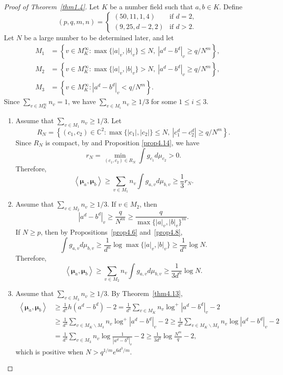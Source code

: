 \documentclass[10pt,a4paper]{amsart}
\numberwithin{equation}{section}
\theoremstyle{plain}
\theoremstyle{definition}
\theoremstyle{remark}
\newcommand{\C}{\mathbb C}
\begin{document}
\begin{proof}[Proof of Theorem~\ref{thm1.4}]
Let $K$ be a number field such that $a,b\in K$. Define
\[
(p,q,m,n)=\begin{cases}
(50,11,1,4) & \text{if }d=2,\\
(9,25,d-2,2) & \text{if }d>2.
\end{cases}
\]
Let $N$ be a large number to be determined later, and let
\begin{align*}
M_{1} & =\left\{v\in M_{K}^{\infty}:\max\{|a|_{v},|b|_{v}\}\leq N,\ \left|a^{d}-b^{d}\right|_{v}\geq q/N^{m}\right\},\\
M_{2} & =\left\{v\in M_{K}^{\infty}:\max\{|a|_{v},|b|_{v}\}>N,\ \left|a^{d}-b^{d}\right|_{v}\geq q/N^{m}\right\},\\
M_{3} & =\left\{v\in M_{K}^{\infty}:\left|a^{d}-b^{d}\right|_{v}<q/N^{m}\right\}.
\end{align*}
Since $\sum_{v\in M_{K}^{\infty}}n_{v}=1$, we have $\sum_{v\in M_{i}}n_{v}\geq1/3$
for some $1\leq i\leq3$.

\begin{enumerate}[wide]
\item Assume that $\sum_{v\in M_{1}}n_{v}\geq1/3$. Let
\[
R_{N}=\left\{(c_{1},c_{2})\in\C^{2}:\max\{|c_{1}|,|c_{2}|\}\leq N,\ \left|c_{1}^{d}-c_{2}^{d}\right|\geq q/N^{m}\right\}.
\]
Since $R_{N}$ is compact, by \cite[Lemma 3.4]{BD1} and Proposition
\ref{prop4.14}, we have 
\[
r_{N}=\min_{(c_{1},c_{2})\in R_{N}}\int g_{c_{1}}d\mu_{c_{2}}>0.
\]
Therefore,
\[
\left\langle \boldsymbol{\mu}_{a},\boldsymbol{\mu}_{b}\right\rangle \geq\sum_{v\in M_{1}}n_{v}\int g_{a,v}d\mu_{b,v}\geq\frac{1}{3}r_{N}.
\]

\item Assume that $\sum_{v\in M_{2}}n_{v}\geq1/3$. If $v\in M_{2}$,
then
\[
|a^{d}-b^{d}|_{v}\geq\frac{q}{N^{m}}\geq\frac{q}{\max\{|a|_{v},|b|_{v}\}^{m}}.
\]
If $N\geq p$, then by Propositions~\ref{prop4.6} and~\ref{prop4.8},
\[
\int g_{a,v}d\mu_{b,v}\geq\frac{1}{d^{n}}\log\max\{|a|_{v},|b|_{v}\}\geq\frac{1}{d^{n}}\log N.
\]
Therefore,
\[
\left\langle \boldsymbol{\mu}_{a},\boldsymbol{\mu}_{b}\right\rangle \geq\sum_{v\in M_{2}}n_{v}\int g_{a,v}d\mu_{b,v}\geq\frac{1}{3d^{n}}\log N.
\]

\item Assume that $\sum_{v\in M_{3}}n_{v}\geq1/3$. By Theorem~\ref{thm4.13},
\allowdisplaybreaks
  \begin{align*}
\left\langle \boldsymbol{\mu}_{a},\boldsymbol{\mu}_{b}\right\rangle  & \geq\frac{1}{d^{3}}h\left(a^{d}-b^{d}\right)-2=\frac{1}{d^{3}}\sum_{v\in M_{K}}n_{v}\log^{+}\left|a^{d}-b^{d}\right|_{v}-2\\
 & \geq\frac{1}{d^{3}}\sum_{v\in M_{K}\backslash M_{3}}n_{v}\log^{+}\left|a^{d}-b^{d}\right|_{v}-2\geq\frac{1}{d^{3}}\sum_{v\in M_{K}\backslash M_{3}}n_{v}\log\left|a^{d}-b^{d}\right|_{v}-2\\
 & =\frac{1}{d^{3}}\sum_{v\in M_{3}}n_{v}\log\frac{1}{\left|a^{d}-b^{d}\right|_{v}}-2\geq\frac{1}{3d^{3}}\log\frac{N^{m}}{q}-2,
\end{align*}
  which is positive when $N>q^{1/m}e^{6d^{3}/m}$.\hfill\qedhere
  \end{enumerate}
\end{proof}
\end{document}
